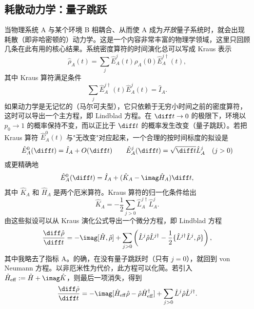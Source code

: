 \subsection{耗散动力学：量子跳跃}
当物理系统 A 与某个环境 B 相耦合、从而使 A 成为{\em 开放}量子系统时，就会出现耗散（即非哈密顿的）动力学。这是一个内容非常丰富的物理学领域，这里只回顾几条在此有用的核心结果。系统密度算符的时间演化总可以写成 Kraus 表示
\begin{equation}
\hat{\rho}_A (t) = \sum_j \hat{E}_A^j(t) \hat{\rho}_A (0) \hat{E}_A^{j\dagger}(t),
\end{equation}
其中 Kraus 算符满足条件
\begin{equation}
\sum_j \hat{E}_A^{j\dagger}(t) \hat{E}_A^j(t) = \hat{I}_A .
\end{equation}
如果动力学是无记忆的（马尔可夫型），它只依赖于无穷小时间之前的密度算符，这时可以导出一个主方程，即 Lindblad 方程。在 $\diff t\rightarrow 0$ 的极限下，环境以 $p_0 \rightarrow 1$ 的概率保持不变，而以正比于 $\diff t$ 的概率发生改变（量子跳跃）。若把 Kraus 算符 $\hat{E}_A^0(t)$ 与"无改变"对应起来，一个合理的按时间标度的拟设是
\begin{equation}
\hat{E}_A^0(\diff t) = \hat{I}_A + O(\diff t) \quad\quad \hat{E}_A^j(\diff t) = \sqrt{\diff t} \hat{L}_A^j  \quad (j>0)
\end{equation}
或更精确地
\begin{equation}
\hat{E}_A^0(\diff t) = \hat{I}_A + (\hat{K}_A - \imag \hat{H}_A) \diff t ,
\end{equation}
其中 $\hat{K}_A$ 和 $\hat{H}_A$ 是两个厄米算符。Kraus 算符的归一化条件给出
\begin{equation}
\hat{K}_A = -\frac{1}{2} \sum_{j>0} \hat{L}_A^{j\dagger} \hat{L}_A^j .
\end{equation}
由这些拟设可以从 Kraus 演化公式导出一个微分方程，即 Lindblad 方程
\begin{equation}
\frac{\diff \hat{\rho}}{\diff t} = - \imag [\hat{H},\hat{\rho}] + \sum_{j>0} \left( \hat{L}^j \hat{\rho} \hat{L}^{j\dagger} - \frac{1}{2} \{ \hat{L}^{j\dagger} \hat{L}^j, \hat{\rho} \} \right) ,
\end{equation} 
其中我略去了指标 A。的确，在没有量子跳跃时（只有 $j=0$），就回到 von Neumann 方程。以非厄米性为代价，此方程可以化简。若引入 $\hat{H}_{{\rm eff}} := \hat{H} + \imag \hat{K}$，则最后一项消失，得到
\begin{equation}
\frac{\diff \hat{\rho}}{\diff t} = - \imag [\hat{H}_{{\rm eff}}\hat{\rho}-\hat{\rho}\hat{H}_{{\rm eff}}^\dagger] + \sum_{j>0} \hat{L}^j \hat{\rho} \hat{L}^{j\dagger} .
\label{eq:Lindblad2}
\end{equation} 

